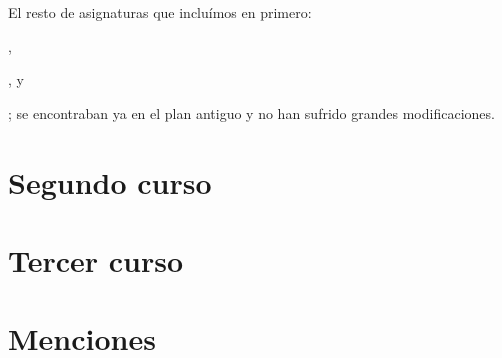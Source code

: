 El resto de asignaturas que incluímos en primero:
\subject{Fundamentos de Computadores},
\subject{Gestión de Organizaciones y Habilidades Profesionales}, y
\subject{Fundamentos en electricidad y electrónica};
se encontraban ya en el plan antiguo y no han sufrido grandes modificaciones.



\section{Segundo curso}

\section{Tercer curso}

\section{Menciones}

